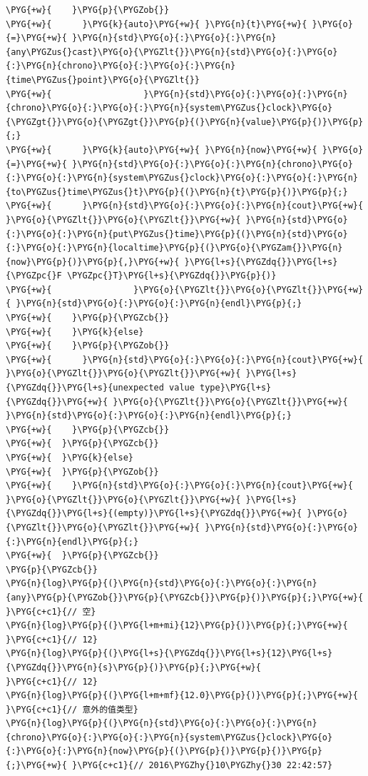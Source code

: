 \begin{codeblockbg}
\begin{Verbatim}[commandchars=\\\{\},breaklines=true,breakanywhere=true,fontsize=\codefont,xleftmargin=17bp]
\PYG{+w}{    }\PYG{p}{\PYGZob{}}
\PYG{+w}{      }\PYG{k}{auto}\PYG{+w}{ }\PYG{n}{t}\PYG{+w}{ }\PYG{o}{=}\PYG{+w}{ }\PYG{n}{std}\PYG{o}{:}\PYG{o}{:}\PYG{n}{any\PYGZus{}cast}\PYG{o}{\PYGZlt{}}\PYG{n}{std}\PYG{o}{:}\PYG{o}{:}\PYG{n}{chrono}\PYG{o}{:}\PYG{o}{:}\PYG{n}{time\PYGZus{}point}\PYG{o}{\PYGZlt{}}
\PYG{+w}{                  }\PYG{n}{std}\PYG{o}{:}\PYG{o}{:}\PYG{n}{chrono}\PYG{o}{:}\PYG{o}{:}\PYG{n}{system\PYGZus{}clock}\PYG{o}{\PYGZgt{}}\PYG{o}{\PYGZgt{}}\PYG{p}{(}\PYG{n}{value}\PYG{p}{)}\PYG{p}{;}
\PYG{+w}{      }\PYG{k}{auto}\PYG{+w}{ }\PYG{n}{now}\PYG{+w}{ }\PYG{o}{=}\PYG{+w}{ }\PYG{n}{std}\PYG{o}{:}\PYG{o}{:}\PYG{n}{chrono}\PYG{o}{:}\PYG{o}{:}\PYG{n}{system\PYGZus{}clock}\PYG{o}{:}\PYG{o}{:}\PYG{n}{to\PYGZus{}time\PYGZus{}t}\PYG{p}{(}\PYG{n}{t}\PYG{p}{)}\PYG{p}{;}
\PYG{+w}{      }\PYG{n}{std}\PYG{o}{:}\PYG{o}{:}\PYG{n}{cout}\PYG{+w}{ }\PYG{o}{\PYGZlt{}}\PYG{o}{\PYGZlt{}}\PYG{+w}{ }\PYG{n}{std}\PYG{o}{:}\PYG{o}{:}\PYG{n}{put\PYGZus{}time}\PYG{p}{(}\PYG{n}{std}\PYG{o}{:}\PYG{o}{:}\PYG{n}{localtime}\PYG{p}{(}\PYG{o}{\PYGZam{}}\PYG{n}{now}\PYG{p}{)}\PYG{p}{,}\PYG{+w}{ }\PYG{l+s}{\PYGZdq{}}\PYG{l+s}{\PYGZpc{}F \PYGZpc{}T}\PYG{l+s}{\PYGZdq{}}\PYG{p}{)}
\PYG{+w}{                }\PYG{o}{\PYGZlt{}}\PYG{o}{\PYGZlt{}}\PYG{+w}{ }\PYG{n}{std}\PYG{o}{:}\PYG{o}{:}\PYG{n}{endl}\PYG{p}{;}
\PYG{+w}{    }\PYG{p}{\PYGZcb{}}
\PYG{+w}{    }\PYG{k}{else}
\PYG{+w}{    }\PYG{p}{\PYGZob{}}
\PYG{+w}{      }\PYG{n}{std}\PYG{o}{:}\PYG{o}{:}\PYG{n}{cout}\PYG{+w}{ }\PYG{o}{\PYGZlt{}}\PYG{o}{\PYGZlt{}}\PYG{+w}{ }\PYG{l+s}{\PYGZdq{}}\PYG{l+s}{unexpected value type}\PYG{l+s}{\PYGZdq{}}\PYG{+w}{ }\PYG{o}{\PYGZlt{}}\PYG{o}{\PYGZlt{}}\PYG{+w}{ }\PYG{n}{std}\PYG{o}{:}\PYG{o}{:}\PYG{n}{endl}\PYG{p}{;}
\PYG{+w}{    }\PYG{p}{\PYGZcb{}}
\PYG{+w}{  }\PYG{p}{\PYGZcb{}}
\PYG{+w}{  }\PYG{k}{else}
\PYG{+w}{  }\PYG{p}{\PYGZob{}}
\PYG{+w}{    }\PYG{n}{std}\PYG{o}{:}\PYG{o}{:}\PYG{n}{cout}\PYG{+w}{ }\PYG{o}{\PYGZlt{}}\PYG{o}{\PYGZlt{}}\PYG{+w}{ }\PYG{l+s}{\PYGZdq{}}\PYG{l+s}{(empty)}\PYG{l+s}{\PYGZdq{}}\PYG{+w}{ }\PYG{o}{\PYGZlt{}}\PYG{o}{\PYGZlt{}}\PYG{+w}{ }\PYG{n}{std}\PYG{o}{:}\PYG{o}{:}\PYG{n}{endl}\PYG{p}{;}
\PYG{+w}{  }\PYG{p}{\PYGZcb{}}
\PYG{p}{\PYGZcb{}}
\PYG{n}{log}\PYG{p}{(}\PYG{n}{std}\PYG{o}{:}\PYG{o}{:}\PYG{n}{any}\PYG{p}{\PYGZob{}}\PYG{p}{\PYGZcb{}}\PYG{p}{)}\PYG{p}{;}\PYG{+w}{                       }\PYG{c+c1}{// 空}
\PYG{n}{log}\PYG{p}{(}\PYG{l+m+mi}{12}\PYG{p}{)}\PYG{p}{;}\PYG{+w}{                               }\PYG{c+c1}{// 12}
\PYG{n}{log}\PYG{p}{(}\PYG{l+s}{\PYGZdq{}}\PYG{l+s}{12}\PYG{l+s}{\PYGZdq{}}\PYG{n}{s}\PYG{p}{)}\PYG{p}{;}\PYG{+w}{                            }\PYG{c+c1}{// 12}
\PYG{n}{log}\PYG{p}{(}\PYG{l+m+mf}{12.0}\PYG{p}{)}\PYG{p}{;}\PYG{+w}{                             }\PYG{c+c1}{// 意外的值类型}
\PYG{n}{log}\PYG{p}{(}\PYG{n}{std}\PYG{o}{:}\PYG{o}{:}\PYG{n}{chrono}\PYG{o}{:}\PYG{o}{:}\PYG{n}{system\PYGZus{}clock}\PYG{o}{:}\PYG{o}{:}\PYG{n}{now}\PYG{p}{(}\PYG{p}{)}\PYG{p}{)}\PYG{p}{;}\PYG{+w}{ }\PYG{c+c1}{// 2016\PYGZhy{}10\PYGZhy{}30 22:42:57}
\end{Verbatim}
\end{codeblockbg}


